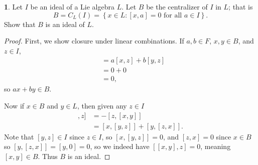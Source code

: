 \documentclass[12pt]{article}
\theoremstyle{definition}
\newtheorem{ex}{}
\begin{document}
\begin{ex}
	Let $I$ be an ideal of a Lie algebra $L$.
	Let $B$ be the centralizer of $I$ in $L$; that is \begin{equation*}
		B = C_L(I) = \left\lbrace x \in L : [x, a] = 0 \text{ for all } a \in I \right\rbrace.
	\end{equation*}
	Show that $B$ is an ideal of $L$.
\end{ex}
\begin{proof}
	First, we show closure under linear combinations.
	If $a, b \in F$, $x, y \in B$, and $z \in I$, \begin{align*}
		[ax + by, z] & = a[x, z] + b[y, z] \\
		             & = 0 + 0             \\
		             & = 0,
	\end{align*}
	so $ax + by \in B$.

	Now if $x \in B$ and $y \in L$, then given any $z \in I$ \begin{align*}
		[[x, y], z] & = -[z, [x, y]]               \\
		            & = [x, [y, z]] + [y, [z, x]].
	\end{align*}
	Note that $[y, z] \in I$ since $z \in I$, so $[x, [y, z]] = 0$, and $[z, x] = 0$ since $x \in B$ so $[y, [z, x]] = [y, 0] = 0$, so we indeed have $[[x,y],z] = 0$, meaning $[x,y] \in B$.
	Thus $B$ is an ideal.
\end{proof}
\end{document}
